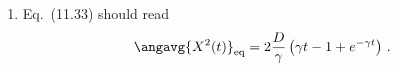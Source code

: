 
\begin{enumerate}
  \item Eq.~(11.33) should read
  \begin{displaymath}
    \angavg{X^2(t)}_\text{eq} = 2 \frac{D}{\gamma} \left( \gamma t - 1 + e^{-\gamma t} \right)
    \, .
  \end{displaymath}
\end{enumerate}
